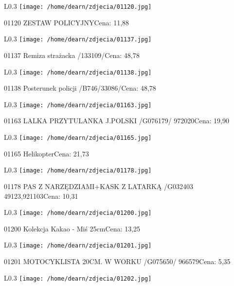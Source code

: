 \begin{wrapfigure}{L}{0.3\textwidth}
\texttt{[image: /home/dearn/zdjecia/01120.jpg]}
\end{wrapfigure}
01120 ZESTAW POLICYJNYCena: 11,88\newline
\begin{wrapfigure}{L}{0.3\textwidth}
\texttt{[image: /home/dearn/zdjecia/01137.jpg]}
\end{wrapfigure}
01137 Remiza strażacka /133109/Cena: 48,78\newline
\begin{wrapfigure}{L}{0.3\textwidth}
\texttt{[image: /home/dearn/zdjecia/01138.jpg]}
\end{wrapfigure}
01138 Posterunek policji /B746/33086/Cena: 48,78\newline
\begin{wrapfigure}{L}{0.3\textwidth}
\texttt{[image: /home/dearn/zdjecia/01163.jpg]}
\end{wrapfigure}
01163 LALKA PRZYTULANKA J.POLSKI /G076179/            972020Cena: 19,90\newline
\begin{wrapfigure}{L}{0.3\textwidth}
\texttt{[image: /home/dearn/zdjecia/01165.jpg]}
\end{wrapfigure}
01165 HelikopterCena: 21,73\newline
\begin{wrapfigure}{L}{0.3\textwidth}
\texttt{[image: /home/dearn/zdjecia/01178.jpg]}
\end{wrapfigure}
01178 PAS Z NARZĘDZIAMI+KASK Z LATARKĄ /G032403 49123,921103Cena: 10,31\newline
\begin{wrapfigure}{L}{0.3\textwidth}
\texttt{[image: /home/dearn/zdjecia/01200.jpg]}
\end{wrapfigure}
01200 Kolekcja Kakao - Miś 25cmCena: 13,25\newline
\begin{wrapfigure}{L}{0.3\textwidth}
\texttt{[image: /home/dearn/zdjecia/01201.jpg]}
\end{wrapfigure}
01201 MOTOCYKLISTA 20CM. W WORKU /G075650/            966579Cena: 5,35\newline
\begin{wrapfigure}{L}{0.3\textwidth}
\texttt{[image: /home/dearn/zdjecia/01202.jpg]}
\end{wrapfigure}
